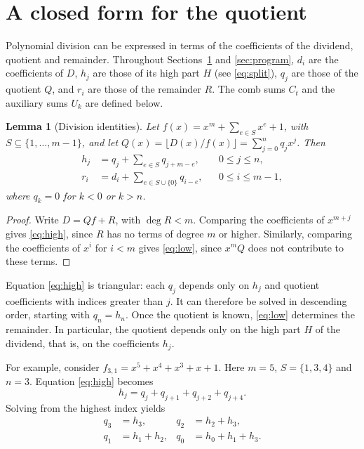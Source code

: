 \documentclass{ieeeaccess}
\theoremstyle{plain}
\newtheorem{lemma}[theorem]{Lemma}
\theoremstyle{definition}
\begin{document}
\section{A closed form for the quotient}\label{sec:quotient}


Polynomial division can be expressed in terms of the coefficients of the
dividend, quotient and remainder. Throughout Sections~\ref{sec:quotient} and
\ref{sec:program}, $d_i$ are the coefficients of $D$, $h_j$ are those of its high part
$H$ (see \eqref{eq:split}), $q_j$ are those of the quotient $Q$, and $r_i$ are those of
the remainder $R$. The comb sums $C_t$ and the auxiliary sums $U_k$ are defined below.

\begin{lemma}[Division identities]\label{lem:division}
Let $f(x)=x^m+\sum_{e\in S}x^e+1$, with $S\subseteq\{1,\dots,m-1\}$, and let
$Q(x)=\lfloor D(x)/f(x)\rfloor=\sum_{j=0}^{n}q_jx^j$. Then
\begin{align}
  h_j &= q_j+\sum_{e\in S} q_{j+m-e},
    && 0\le j\le n, \label{eq:high}\\
  r_i &= d_i+\sum_{e\in S\cup\{0\}} q_{i-e},
    && 0\le i\le m-1, \label{eq:low}
\end{align}
where $q_k=0$ for $k<0$ or $k>n$.
\end{lemma}

\begin{proof}
Write $D=Qf+R$, with $\deg R<m$. Comparing the coefficients of $x^{m+j}$ gives
\eqref{eq:high}, since $R$ has no terms of degree $m$ or higher. Similarly,
comparing the coefficients of $x^i$ for $i<m$ gives \eqref{eq:low}, since $x^mQ$
does not contribute to these terms.
\end{proof}

Equation \eqref{eq:high} is triangular: each $q_j$ depends only on $h_j$ and
quotient coefficients with indices greater than $j$. It can therefore be solved
in descending order, starting with $q_n=h_n$. Once the quotient is known,
\eqref{eq:low} determines the remainder. In particular, the quotient depends
only on the high part $H$ of the dividend, that is, on the coefficients $h_j$.

For example, consider $f_{3,1}=x^5+x^4+x^3+x+1$. Here $m=5$, $S=\{1,3,4\}$ and
$n=3$. Equation \eqref{eq:high} becomes
\[
  h_j=q_j+q_{j+1}+q_{j+2}+q_{j+4}.
\]
Solving from the highest index yields
\begin{align*}
  q_3&=h_3, & q_2&=h_2+h_3,\\
  q_1&=h_1+h_2, & q_0&=h_0+h_1+h_3 .
\end{align*}
\end{document}
